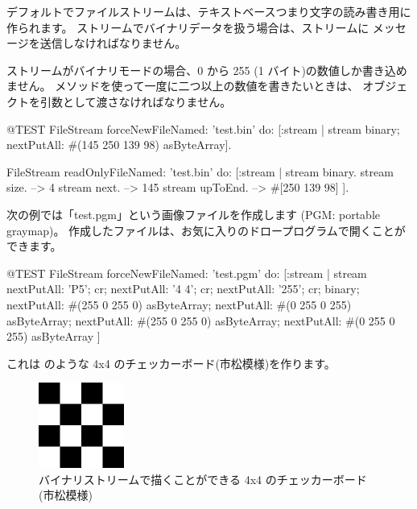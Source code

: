 \documentclass[a4paper,10pt,twoside]{book}
\begin{document}
デフォルトでファイルストリームは、テキストベースつまり文字の読み書き用に作られます。
ストリームでバイナリデータを扱う場合は、ストリームに  メッセージを送信しなければなりません。

ストリームがバイナリモードの場合、0 から 255 (1 バイト)の数値しか書き込めません。
 メソッドを使って一度に二つ以上の数値を書きたいときは、 オブジェクトを引数として渡さなければなりません。

\begin{code}{@TEST}
FileStream
  forceNewFileNamed: 'test.bin'
  do: [:stream |
          stream
            binary;
            nextPutAll: #(145 250 139 98) asByteArray].

FileStream
  readOnlyFileNamed: 'test.bin'
  do: [:stream |
          stream binary.
          stream size.         --> 4
          stream next.         --> 145
          stream upToEnd. --> #[250 139 98]
      ].
\end{code}

次の例では「test.pgm」という画像ファイルを作成します (PGM: portable graymap)。
作成したファイルは、お気に入りのドロープログラムで開くことができます。

\begin{code}{@TEST}
FileStream
  forceNewFileNamed: 'test.pgm' 
  do: [:stream |
	stream
		nextPutAll: 'P5'; cr;
		nextPutAll: '4 4'; cr;
		nextPutAll: '255'; cr;
		binary;
		nextPutAll: #(255 0 255 0) asByteArray;
		nextPutAll: #(0 255 0 255) asByteArray;
		nextPutAll: #(255 0 255 0) asByteArray;
		nextPutAll: #(0 255 0 255) asByteArray
	]
\end{code}

これは のような 4x4 のチェッカーボード(市松模様)を作ります。

\begin{figure}[!ht]
\centerline{\includegraphics[width=0.25\textwidth]{checkerboard4x4}}
\caption{バイナリストリームで描くことができる 4x4 のチェッカーボード(市松模様)}
\vspace{.2in}
\end{figure}
\end{document}
